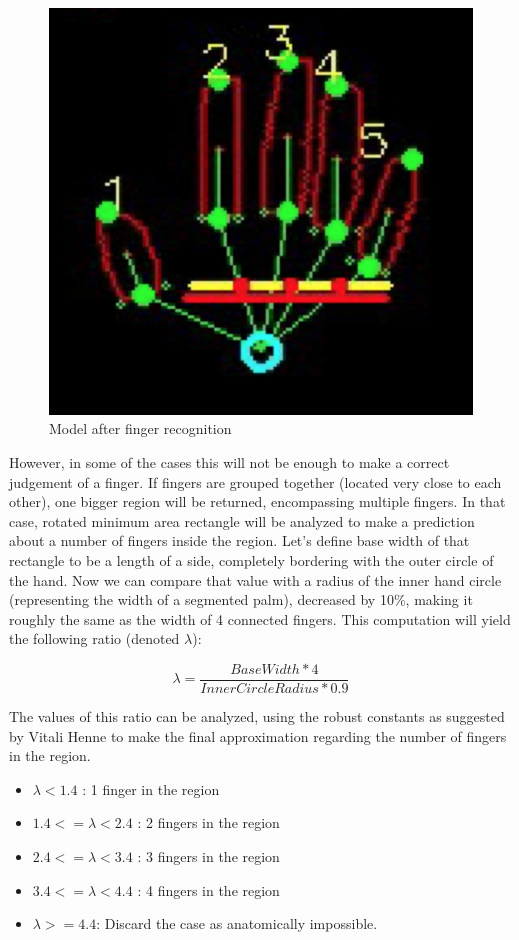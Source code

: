 \documentclass[a4paper,11pt,oneside]{article}
\begin{document}
 \begin{figure}[H]
  \centering
  \includegraphics[scale=0.7]{hand-recognized.png}
  \caption{Model after finger recognition}
  \end{figure}

However, in some of the cases this will not be enough to make a correct judgement of a finger. If fingers are grouped together (located very close to each other), one bigger region will be returned, encompassing multiple fingers. In that case, rotated minimum area rectangle will be analyzed to make a prediction about a number of fingers inside the region. Let's define base width of that rectangle to be a length of a side, completely bordering with the outer circle of the hand. Now we can compare that value with a radius of the inner hand circle (representing the width of a segmented palm), decreased by 10\%, making it roughly the same as the width of 4 connected fingers. This computation will yield the following ratio (denoted $\lambda$):

\[\lambda = \frac{BaseWidth * 4}{InnerCircleRadius * 0.9} \]

The values of this ratio can be analyzed, using the robust constants as suggested by Vitali Henne \cite{VH01} to make the final approximation regarding the number of fingers in the region.

\begin{itemize}
\item $\lambda < 1.4$ : 1 finger in the region
\item $1.4 <= \lambda < 2.4$ : 2 fingers in the region
\item $2.4 <= \lambda < 3.4$ : 3 fingers in the region
\item $3.4 <= \lambda < 4.4$ : 4 fingers in the region
\item $\lambda >= 4.4$: Discard the case as anatomically impossible.
\end{itemize}
\end{document}

